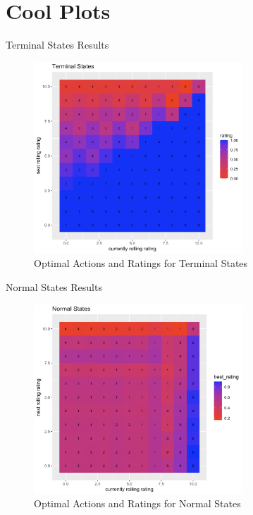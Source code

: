 \documentclass{beamer}
\begin{document}
\section{Cool Plots}

\begin{frame}{Terminal States Results}
    \begin{figure}[h]
        \centering
        \includegraphics[width=0.7\textwidth]{Screenshot 2023-12-12 at 20.21.12.png}
        \caption{Optimal Actions and Ratings for Terminal States}
    \end{figure}
\end{frame}

\begin{frame}{Normal States Results}
    \begin{figure}[h]
        \centering
        \includegraphics[width=0.7\textwidth]{Screenshot 2023-12-14 at 01.43.15.png}
        \caption{Optimal Actions and Ratings for Normal States}
    \end{figure}
\end{frame}
\end{document}
